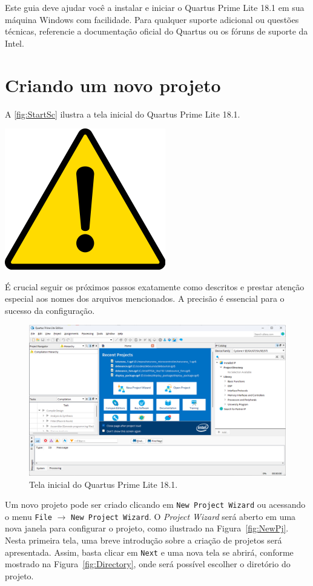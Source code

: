 \documentclass[12pt,a4paper]{article}
\newcommand{\Version}{18.1}
\newcommand{\Attention}[1]{
    \begin{tcolorbox}[colback=red!5!white, colframe=red!75!black]
        \noindent
        \begin{minipage}[c]{1cm}%
            \includegraphics[width=\linewidth]{figs/attention.png}
        \end{minipage}%
        \hfill%
        \begin{minipage}[c]{\dimexpr\linewidth-1cm-2mm}%
            \begin{center}
                #1    
            \end{center}            
        \end{minipage}
    \end{tcolorbox}
}
\begin{document}
Este guia deve ajudar você a instalar e iniciar o Quartus Prime Lite \Version{} em sua máquina Windows com facilidade. Para qualquer suporte adicional ou questões técnicas, referencie a documentação oficial do Quartus ou os fóruns de suporte da Intel.


\section{Criando um novo projeto}
\label{sec:proj}

A \autoref{fig:StartSc} ilustra a tela inicial do Quartus Prime Lite \Version.

\Attention{É crucial seguir os próximos passos exatamente como descritos e prestar atenção especial aos nomes dos arquivos mencionados. A precisão é essencial para o sucesso da configuração.}

\begin{figure}[htbp]
    \centering
    \includegraphics[width=\textwidth]{./figs/StartSc.png}
    \caption{Tela inicial do Quartus Prime Lite \Version.}
    \label{fig:StartSc}
\end{figure}

Um novo projeto pode ser criado clicando em \texttt{New Project Wizard} ou acessando o menu \texttt{File} $\rightarrow$ \texttt{New Project Wizard}. O \textit{Project Wizard} será aberto em uma nova janela para configurar o projeto, como ilustrado na Figura~\ref{fig:NewPj}. Nesta primeira tela, uma breve introdução sobre a criação de projetos será apresentada. Assim, basta clicar em \texttt{Next} e uma nova tela se abrirá, conforme mostrado na Figura~\ref{fig:Directory}, onde será possível escolher o diretório do projeto.
\end{document}
